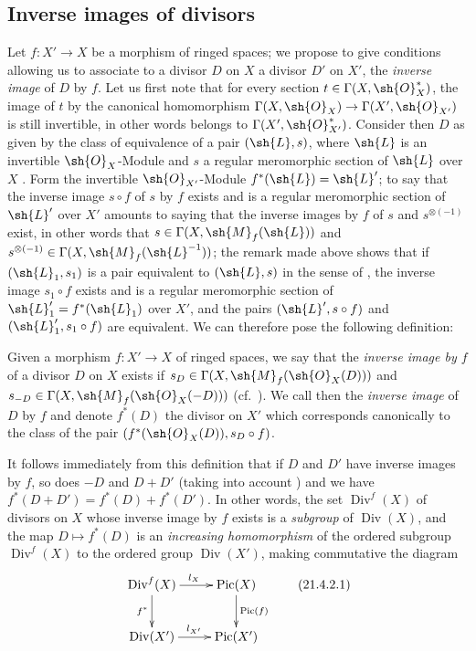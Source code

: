 \subsection{Inverse images of divisors}
\label{subsection:IV.21.4}

\begin{env}[21.4.1]
\label{IV.21.4.1}
Let $f:X'\to X$ be a morphism of ringed spaces;
we propose to give conditions allowing us to associate to a divisor $D$ on $X$ a divisor $D'$ on $X'$, the \emph{inverse image} of $D$ by $f$.
Let us first note that for every section $t\in\Gamma(X,\sh{O}_X^*)$, the image of $t$ by the canonical homomorphism $\Gamma(X,\sh{O}_X)\to\Gamma(X',\sh{O}_{X'})$ is still invertible, in other words belongs to $\Gamma(X',\sh{O}_{X'}^*)$.
Consider then $D$ as given by the class of equivalence of a pair $(\sh{L},s)$, where $\sh{L}$ is an invertible $\sh{O}_X$-Module and $s$ a regular meromorphic section of $\sh{L}$ over $X$ .
Form the invertible $\sh{O}_{X'}$-Module $f^*(\sh{L})=\sh{L}'$;
to say that the inverse image $s\circ f$ of $s$ by $f$ exists  and is a regular meromorphic section of $\sh{L}'$ over $X'$ amounts to saying that the inverse images by $f$ of $s$ and $s^{\otimes(-1)}$ exist, in other words that $s\in\Gamma(X,\sh{M}_f(\sh{L}))$ and $s^{\otimes(-1)}\in\Gamma(X,\sh{M}_f(\sh{L}^{-1}))$;
the remark made above shows that if $(\sh{L}_1,s_1)$ is a pair equivalent to $(\sh{L},s)$ in the sense of , the inverse image $s_1\circ f$ exists and is a regular meromorphic section of $\sh{L}_1'=f^*(\sh{L}_1)$ over $X'$, and the pairs $(\sh{L}',s\circ f)$ and $(\sh{L}_1',s_1\circ f)$ are equivalent.
We can therefore pose the following definition:
\end{env}

\begin{definition}[21.4.2]
\label{IV.21.4.2}
Given a morphism $f:X'\to X$ of ringed spaces, we say that the \emph{inverse image by $f$} of a divisor $D$ on $X$ exists if $s_D\in\Gamma(X,\sh{M}_f(\sh{O}_X(D)))$ and $s_{-D}\in\Gamma(X,\sh{M}_f(\sh{O}_X(-D)))$ (cf.\ ).
We call then the \emph{inverse image} of $D$ by $f$ and denote $f^*(D)$ the divisor on $X'$ which corresponds canonically  to the class of the pair $(f^*(\sh{O}_X(D)),s_D\circ f)$.
\end{definition}

It follows immediately from this definition that if $D$ and $D'$ have inverse images by $f$, so does $-D$ and $D+D'$ (taking into account ) and we have
$f^*(D+D')=f^*(D)+f^*(D')$.
In other words, the set $\operatorname{Div}^f(X)$ of divisors on $X$ whose inverse image by $f$ exists is a \emph{subgroup} of $\operatorname{Div}(X)$, and the map $D\mapsto f^*(D)$ is an \emph{increasing homomorphism} of the ordered subgroup $\operatorname{Div}^f(X)$ to the ordered group $\operatorname{Div}(X')$, making commutative the diagram
\[
\label{IV.21.4.2.1}
  \xymatrix{
    \operatorname{Div}^f(X) \ar[r]^{l_X} \ar[d]_{f^*} & \operatorname{Pic}(X) \ar[d]^{\operatorname{Pic}(f)} \\
    \operatorname{Div}(X') \ar[r]^{l_{X'}} & \operatorname{Pic}(X')
  }
  \tag{21.4.2.1}
\]


